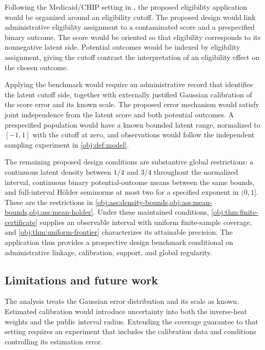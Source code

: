 Following the Medicaid/CHIP setting in \citet[Chapter~2, Section~2.6]{Dong2018Thesis}, the proposed eligibility application would be organized around an eligibility cutoff.
The proposed design would link administrative eligibility assignment to a contaminated score and a prespecified binary outcome. The score would be oriented so that eligibility corresponds to its nonnegative latent side. Potential outcomes would be indexed by eligibility assignment, giving the cutoff contrast the interpretation of an eligibility effect on the chosen outcome.

Applying the benchmark would require an administrative record that identifies the latent cutoff side, together with externally justified Gaussian calibration of the score error and its known scale. The proposed error mechanism would satisfy joint independence from the latent score and both potential outcomes. A prespecified population would have a known bounded latent range, normalized to \([-1,1]\) with the cutoff at zero, and observations would follow the independent sampling experiment in \cref{obj:def:model}.

The remaining proposed design conditions are substantive global restrictions: a continuous latent density between \(1/4\) and \(3/4\) throughout the normalized interval, continuous binary potential-outcome means between the same bounds, and full-interval Hölder seminorms at most two for a specified exponent in \((0,1]\). These are the restrictions in \cref{obj:ass:density-bounds,obj:ass:mean-bounds,obj:ass:mean-holder}. Under these maintained conditions, \cref{obj:thm:finite-certificate} supplies an observable interval with uniform finite-sample coverage, and \cref{obj:thm:uniform-frontier} characterizes its attainable precision. The application thus provides a prospective design benchmark conditional on administrative linkage, calibration, support, and global regularity.

\subsection{Limitations and future work}

The analysis treats the Gaussian error distribution and its scale as known. Estimated calibration would introduce uncertainty into both the inverse-heat weights and the public interval radius. Extending the coverage guarantee to that setting requires an experiment that includes the calibration data and conditions controlling its estimation error.

